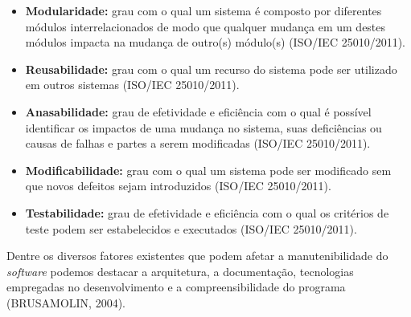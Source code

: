 \begin{itemize}

	\item \textbf{Modularidade:} grau com o qual um sistema é composto por diferentes módulos interrelacionados de modo que qualquer mudança em um destes módulos impacta na mudança de outro(s) módulo(s) (ISO/IEC 25010/2011).
	\item \textbf{Reusabilidade:} grau com o qual um recurso do sistema pode ser utilizado em outros sistemas (ISO/IEC 25010/2011).
	\item \textbf{Anasabilidade:} grau de efetividade e eficiência com o qual é possível identificar os impactos de uma mudança no sistema, suas deficiências ou causas de falhas e partes a serem modificadas (ISO/IEC 25010/2011).
	\item \textbf{Modificabilidade:} grau com o qual um sistema pode ser modificado sem que novos defeitos sejam introduzidos (ISO/IEC 25010/2011).
	\item \textbf{Testabilidade:} grau de efetividade e eficiência com o qual os critérios de teste podem ser estabelecidos e executados (ISO/IEC 25010/2011).

\end{itemize}

	Dentre os diversos fatores existentes que podem afetar a manutenibilidade do \textit{software} podemos destacar a arquitetura, a documentação, tecnologias empregadas no desenvolvimento e a compreensibilidade do programa (BRUSAMOLIN, 2004).
